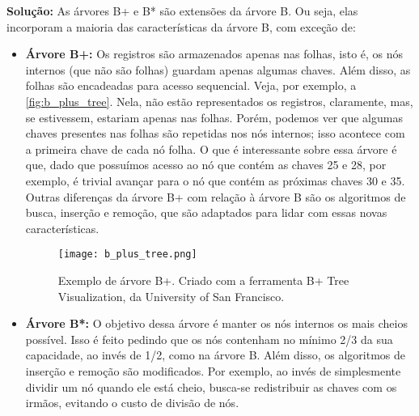 \textbf{Solução:}
As árvores B+ e B* são extensões da árvore B. Ou seja, elas incorporam a maioria das características da árvore B, com exceção de:
\begin{itemize}
    \item \textbf{Árvore B+:} Os registros são armazenados apenas nas folhas, isto é, os nós internos (que não são folhas) guardam apenas algumas chaves. Além disso, as folhas são encadeadas para acesso sequencial. Veja, por exemplo, a \autoref{fig:b_plus_tree}. Nela, não estão representados os registros, claramente, mas, se estivessem, estariam apenas nas folhas. Porém, podemos ver que algumas chaves presentes nas folhas são repetidas nos nós internos; isso acontece com a primeira chave de cada nó folha. O que é interessante sobre essa árvore é que, dado que possuímos acesso ao nó que contém as chaves 25 e 28, por exemplo, é trivial avançar para o nó que contém as próximas chaves 30 e 35. Outras diferenças da árvore B+ com relação à árvore B são os algoritmos de busca, inserção e remoção, que são adaptados para lidar com essas novas características.
    \begin{figure}[H]
        \centering
        \texttt{[image: b\_plus\_tree.png]}
        \caption{Exemplo de árvore B+. Criado com a ferramenta B+ Tree Visualization\protect\footnotemark, da University of San Francisco.}
        \label{fig:b_plus_tree}
    \end{figure}
    \item \textbf{Árvore B*:} O objetivo dessa árvore é manter os nós internos os mais cheios possível. Isso é feito pedindo que os nós contenham no mínimo 2/3 da sua capacidade, ao invés de 1/2, como na árvore B. Além disso, os algoritmos de inserção e remoção são modificados. Por exemplo, ao invés de simplesmente dividir um nó quando ele está cheio, busca-se redistribuir as chaves com os irmãos, evitando o custo de divisão de nós.
\end{itemize}
